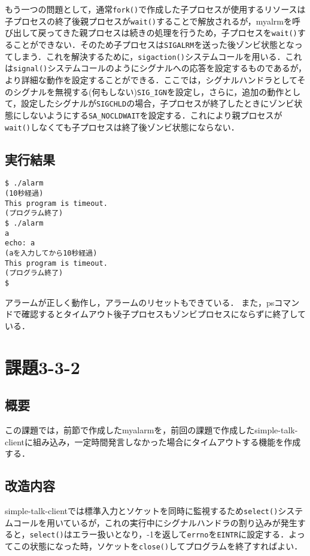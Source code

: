 \documentclass[a4j,10pt,titlepage]{jsarticle}
\begin{document}
もう一つの問題として，通常\verb|fork()|で作成した子プロセスが使用するリソースは子プロセスの終了後親プロセスが\verb|wait()|することで解放されるが，myalrmを呼び出して戻ってきた親プロセスは続きの処理を行うため，子プロセスを\verb|wait()|することができない．そのため子プロセスは\verb|SIGALRM|を送った後ゾンビ状態となってしまう．これを解決するために，\verb|sigaction()|システムコールを用いる．これは\verb|signal()|システムコールのようにシグナルへの応答を設定するものであるが，より詳細な動作を設定することができる．ここでは，シグナルハンドラとしてそのシグナルを無視する(何もしない)\verb|SIG_IGN|を設定し，さらに，追加の動作として，設定したシグナルが\verb|SIGCHLD|の場合，子プロセスが終了したときにゾンビ状態にしないようにする\verb|SA_NOCLDWAIT|を設定する．これにより親プロセスが\verb|wait()|しなくても子プロセスは終了後ゾンビ状態にならない．

\subsection{実行結果}
\begin{verbatim}
$ ./alarm
(10秒経過)
This program is timeout.
(プログラム終了)
$ ./alarm
a
echo: a
(aを入力してから10秒経過)
This program is timeout.
(プログラム終了)
$
\end{verbatim}
アラームが正しく動作し，アラームのリセットもできている．
また，psコマンドで確認するとタイムアウト後子プロセスもゾンビプロセスにならずに終了している．

\section{課題3-3-2}
\subsection{概要}
この課題では，前節で作成したmyalarmを，前回の課題で作成したsimple-talk-clientに組み込み，一定時間発言しなかった場合にタイムアウトする機能を作成する．

\subsection{改造内容}
simple-talk-clientでは標準入力とソケットを同時に監視するため\verb|select()|システムコールを用いているが，これの実行中にシグナルハンドラの割り込みが発生すると，\verb|select()|はエラー扱いとなり，-1を返して\verb|errno|を\verb|EINTR|に設定する．よってこの状態になった時，ソケットを\verb|close()|してプログラムを終了すればよい．
\end{document}
